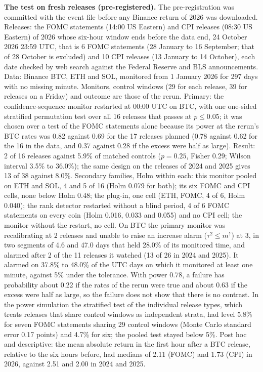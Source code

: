 \documentclass[
]{article}
\begin{document}
\textbf{The test on fresh releases (pre-registered).} The
pre-registration was committed with the event file before any Binance
return of 2026 was downloaded. Releases: the FOMC statements (14:00 US
Eastern) and CPI releases (08:30 US Eastern) of 2026 whose six-hour
window ends before the data end, 24 October 2026 23:59 UTC, that is 6
FOMC statements (28 January to 16 September; that of 28 October is
excluded) and 10 CPI releases (13 January to 14 October), each date
checked by web search against the Federal Reserve and BLS announcements.
Data: Binance BTC, ETH and SOL, monitored from 1 January 2026 for 297
days with no missing minute. Monitors, control windows (29 for each
release, 39 for releases on a Friday) and outcome are those of the
rerun. Primary: the confidence-sequence monitor restarted at 00:00 UTC
on BTC, with one one-sided stratified permutation test over all 16
releases that passes at \(p \le 0.05\); it was chosen over a test of the
FOMC statements alone because its power at the rerun's BTC rates was
0.82 against 0.69 for the 17 releases planned (0.78 against 0.62 for the
16 in the data, and 0.37 against 0.28 if the excess were half as large).
Result: 2 of 16 releases against 5.9\% of matched controls
(\(p = 0.25\), Fisher 0.29; Wilson interval 3.5\% to 36.0\%); the same
design on the releases of 2024 and 2025 gives 13 of 38 against 8.0\%.
Secondary families, Holm within each: this monitor pooled on ETH and
SOL, 4 and 5 of 16 (Holm 0.079 for both); its six FOMC and CPI cells,
none below Holm 0.48; the plug-in, one cell (ETH, FOMC, 4 of 6, Holm
0.040); the rank detector restarted without a blind period, 4 of 6 FOMC
statements on every coin (Holm 0.016, 0.033 and 0.055) and no CPI cell;
the monitor without the restart, no cell. On BTC the primary monitor was
recalibrating at 2 releases and unable to raise an increase alarm
(\(\tau^2 \le m^{\uparrow}\)) at 3, in two segments of 4.6 and 47.0 days
that held 28.0\% of its monitored time, and alarmed after 2 of the 11
releases it watched (13 of 26 in 2024 and 2025). It alarmed on 37.8\% to
48.0\% of the UTC days on which it monitored at least one minute,
against 5\% under the tolerance. With power 0.78, a failure has
probability about 0.22 if the rates of the rerun were true and about
0.63 if the excess were half as large, so the failure does not show that
there is no contrast. In the power simulation the stratified test of the
individual release types, which treats releases that share control
windows as independent strata, had level 5.8\% for seven FOMC statements
sharing 29 control windows (Monte Carlo standard error 0.17 points) and
4.7\% for six; the pooled test stayed below 5\%. Post hoc and
descriptive: the mean absolute return in the first hour after a BTC
release, relative to the six hours before, had medians of 2.11 (FOMC)
and 1.73 (CPI) in 2026, against 2.51 and 2.00 in 2024 and 2025.
\end{document}
